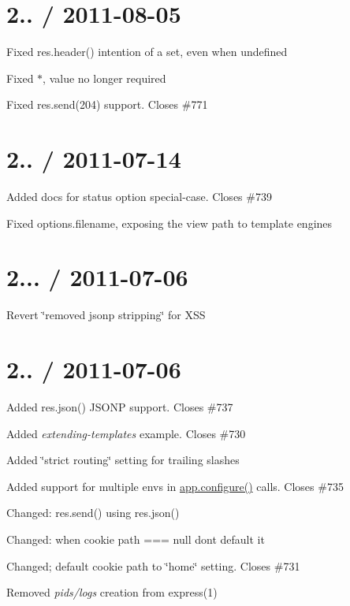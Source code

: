 \section*{2.. / 2011-\/08-\/05 }


\begin{DoxyItemize}
\item Fixed {\ttfamily res.\+header()} intention of a set, even when {\ttfamily undefined}
\item Fixed {\ttfamily $\ast$}, value no longer required
\item Fixed {\ttfamily res.\+send(204)} support. Closes \#771
\end{DoxyItemize}

\section*{2.. / 2011-\/07-\/14 }


\begin{DoxyItemize}
\item Added docs for {\ttfamily status} option special-\/case. Closes \#739
\item Fixed {\ttfamily options.\+filename}, exposing the view path to template engines
\end{DoxyItemize}

\section*{2... / 2011-\/07-\/06 }


\begin{DoxyItemize}
\item Revert \char`\"{}removed jsonp stripping\char`\"{} for X\+S\+S
\end{DoxyItemize}

\section*{2.. / 2011-\/07-\/06 }


\begin{DoxyItemize}
\item Added {\ttfamily res.\+json()} J\+S\+O\+N\+P support. Closes \#737
\item Added {\itshape extending-\/templates} example. Closes \#730
\item Added \char`\"{}strict routing\char`\"{} setting for trailing slashes
\item Added support for multiple envs in {\ttfamily \hyperlink{namespaceversion_aedc91fd7b4b027899ea1441123d88f96}{app.\+configure()}} calls. Closes \#735
\item Changed\+: {\ttfamily res.\+send()} using {\ttfamily res.\+json()}
\item Changed\+: when cookie {\ttfamily path === null} don\textquotesingle{}t default it
\item Changed; default cookie path to \char`\"{}home\char`\"{} setting. Closes \#731
\item Removed {\itshape pids/logs} creation from express(1)
\end{DoxyItemize}

